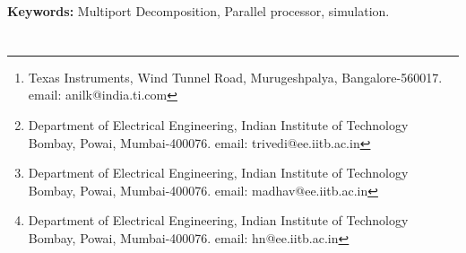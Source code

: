 \documentclass[10pt,psfig,letterpaper,twocolumn]{article}
\begin{document}
 
% 
%


\title{}
\author{
{}\thanks{Texas Instruments, Wind Tunnel Road, Murugeshpalya, Bangalore-560017. email: anilk@india.ti.com }, \and
{}\thanks{Department of Electrical Engineering, Indian Institute of Technology Bombay, Powai, Mumbai-400076. email: trivedi@ee.iitb.ac.in}, \and 
{}\thanks{Department of Electrical Engineering, Indian Institute of Technology Bombay, Powai, Mumbai-400076. email: madhav@ee.iitb.ac.in}, \and
{}\thanks{ Department of Electrical Engineering, Indian Institute of Technology Bombay, Powai, Mumbai-400076. email: hn@ee.iitb.ac.in}\\
}
\date{}
\maketitle
\thispagestyle{empty}
\begin{abstract}
Physical problems offer scope for macro level parallelization of solution by their essential structure. For parallelization of
electrical network simulation, the most natural structure based method is that of {\it Multiport Decomposition}. In this paper
this method is used for the simulation of electrical networks consisting of resistors, independent and controlled sources using 
a distributed cluster of weakly coupled processors. 
Results are presented for the cases where the number of processors
are 1,2,4,8 and for circuit sizes upto 700,000 nodes and
1.4 million edges. We use a cluster of Pentium IV processors linked 
through a 10/100MBPS ethernet switch.\\
\end{abstract}
{\bf Keywords:}
Multiport Decomposition, Parallel processor, simulation.
\section*{}
\end{document}
